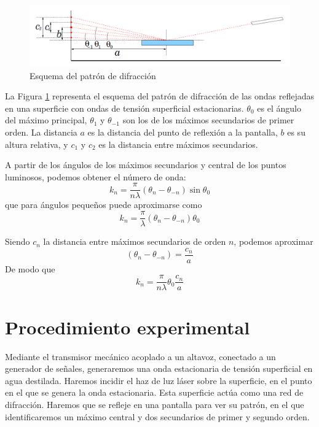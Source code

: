 \documentclass[a4paper,12pt,spanish]{article}
\begin{document}
	
	
\begin{figure}[H]
	\centering
	\includegraphics[width=\linewidth]{../fotos/image.S8OFM2}
	\caption{Esquema del patrón de difracción}
	\label{fig:image}
\end{figure}
	
	La Figura \ref{fig:image} representa el esquema del patrón de difracción de las ondas reflejadas en una superficie con ondas de tensión superficial estacionarias. $\theta_0$ es el ángulo del máximo principal, $\theta_1$ y $\theta_{-1}$ son los de los máximos secundarios de primer orden. La distancia $a$ es la distancia del punto de reflexión a la pantalla, $b$ es su altura relativa, y $c_1$ y $c_2$ es la distancia entre máximos secundarios.
	
	
	A partir de los ángulos de los máximos secundarios y central de los puntos luminosos, podemos obtener el número de onda:
	\[ k_n = \frac{\pi}{n\lambda}(\theta_n - \theta_{-n})\sin\theta_0
	\]
	que para ángulos pequeños puede aproximarse como 
	\[ k_n = \frac{\pi}{\lambda}(\theta_n - \theta_{-n})\theta_0
	\]
	
	Siendo $c_n$ la distancia entre máximos secundarios de orden $n$, podemos aproximar 
	\[(\theta_n - \theta_{-n}) = \frac{c_n}{a}
	\]
	De modo que 
	\[ k_n = \frac{\pi}{n \lambda} \theta_0 \frac{c_n}{a}
	\]
	
	
	
	
	
	\section{Procedimiento experimental}
	
	Mediante el transmisor mecánico acoplado a un altavoz, conectado a un generador de señales, generaremos una onda estacionaria de tensión superficial en agua destilada. Haremos incidir el haz de luz láser sobre la superficie, en el punto en el que se genera la onda estacionaria. Esta superficie actúa como una red de difracción. Haremos que se refleje en una pantalla para ver su patrón, en el que identificaremos un máximo central y dos secundarios de primer y segundo orden.
\end{document}

